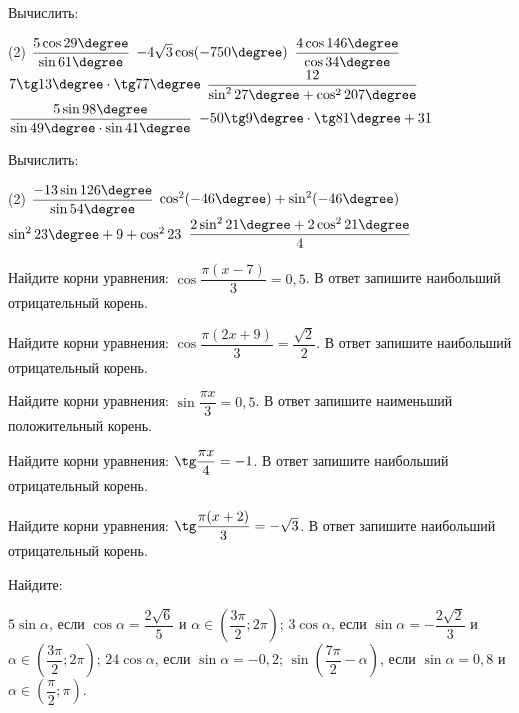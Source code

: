 \begin{consultation}
	\begin{listofex}
		\item Вычислить: 
		\begin{tasks}(2)
			\task \( \dfrac{5\cos29\degree}{\sin61\degree} \)
			\task \( -4\sqrt{3}\cos(-750\degree) \)
			\task \( \dfrac{4\cos146\degree}{\cos34\degree} \)
			\task \( 7\tg13\degree\cdot\tg77\degree \)
			\task \( \dfrac{12}{\sin^227\degree+\cos^2207\degree} \)
			\task \( \dfrac{5\sin98\degree}{\sin49\degree\cdot\sin41\degree} \)
			\task \( -50\tg9\degree\cdot\tg81\degree+31 \)
		\end{tasks}
		\item Вычислить: %
		\begin{tasks}(2)
			\task \( \dfrac{-13\sin126\degree}{\sin54\degree} \)
			\task \( \cos^2(-46\degree)+\sin^2(-46\degree) \)
			\task \( \sin^223\degree+9+\cos^223 \)
			\task \( \dfrac{2\sin^221\degree+2\cos^221\degree}{4} \)
		\end{tasks}
		\item Найдите корни уравнения: \( \cos \dfrac{ \pi(x-7) }{ 3 } = 0,5 \).  В ответ запишите наибольший отрицательный корень.
		\item Найдите корни уравнения: \( \cos \dfrac{ \pi(2x+9) }{ 3 } = \dfrac{ \sqrt{2} }{ 2 } \).  В ответ запишите наибольший отрицательный корень.
		\item Найдите корни уравнения: \( \sin \dfrac{ \pi x }{ 3 } = 0,5 \).  В ответ запишите наименьший положительный корень.
		\item Найдите корни уравнения: \( \tg \dfrac{ \pi x }{ 4 } = -1 \).  В ответ запишите наибольший отрицательный корень.
		\item Найдите корни уравнения: \( \tg \dfrac{ \pi (x+2) }{ 3 } = -\sqrt{3} \).  В ответ запишите наибольший отрицательный корень.
		\item Найдите: %
		\begin{tasks}
			\task \( 5\sin\alpha \), если \( \cos\alpha=\dfrac{2\sqrt{6}}{5} \) и \( \alpha\in\left( \dfrac{3\pi}{2}; 2\pi \right) \);
			\task \( 3\cos\alpha \), если \( \sin\alpha=-\dfrac{2\sqrt{2}}{3} \) и \( \alpha\in\left( \dfrac{3\pi}{2}; 2\pi \right) \);
			\task \( 24\cos\alpha \), если \( \sin\alpha=-0,2 \);
			\task \( \sin\left( \dfrac{7\pi}{2}-\alpha \right) \), если \( \sin\alpha=0,8 \) и \( \alpha\in\left( \dfrac{\pi}{2}; \pi \right) \).
		\end{tasks}

\end{listofex}
\end{consultation}

